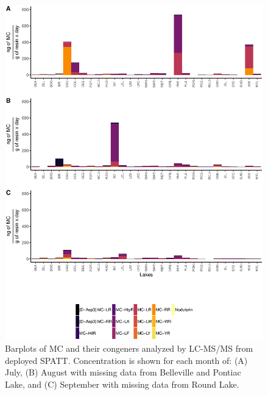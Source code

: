 \begin{figure}[!h] 
	\includegraphics[width=\textwidth]{figures/spatter}
	\vspace*{-15mm}
	\caption{Barplots of MC and their congeners analyzed by LC-MS/MS from deployed SPATT. Concentration is shown for each month of:
(A) July,
(B) August with missing data from Belleville and Pontiac Lake, and
(C) September with missing data from Round Lake.}
	\label{fig:spatter}
\end{figure}


